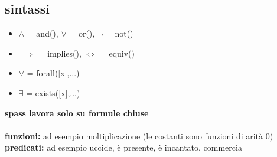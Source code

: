\documentclass{article}
\begin{document}
\begin{multicols*}{3}
 		\subsection{sintassi}
 		\begin{itemize}
 			\setlength\itemsep{0.1mm}
 			\item \(\land\) = and(), \(\lor\) = or(), \(\neg\) = not()
 			\item \(\implies\) = implies(), \(\iff\) = equiv()
 			\item \(\forall\) = forall([x],...)
 			\item \(\exists\) = exists([x],...)
 		\end{itemize}
 		\textbf{spass lavora solo su formule chiuse}\\\\
 		\textbf{funzioni:}
 		ad esempio moltiplicazione (le costanti sono funzioni di arità 0)\\
 		\textbf{predicati:}
 		ad esempio uccide, è presente, è incantato, commercia\\
		\end{multicols*}
	
\end{document}
